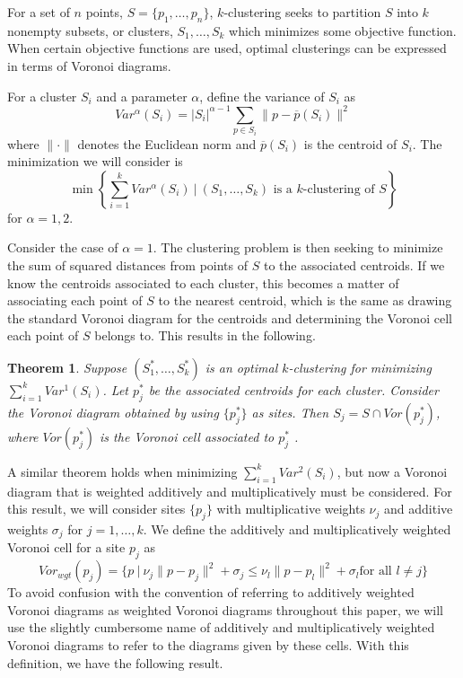 \documentclass[a4paper, 11pt]{article}
\newtheorem{theorem}{Theorem}[section]
\begin{document}
For a set of $n$ points, $S = \{p_1, \dots, p_n \}$, $k$-clustering seeks to partition $S$ into $k$ nonempty subsets, or clusters, $S_1, \dots, S_k$ which minimizes some objective
function. When certain objective functions are used, optimal clusterings can be expressed in terms of Voronoi diagrams.

For a cluster $S_i$ and a
parameter $\alpha$, define
the variance of $S_i$ as
\begin{equation}
  Var^\alpha(S_i) = |S_i|^{\alpha-1} \sum_{p \in S_i} \| p - \overline{p}(S_i) \|^2
  \label{def:var}
\end{equation}
where $\| \cdot \|$ denotes the Euclidean norm and $\overline{p}(S_i)$ is the centroid of $S_i$. The minimization we will consider is
\begin{equation}
  \min \left\{ \sum_{i=1}^k Var^\alpha (S_i) \ | \ (S_1,\dots, S_k) \text{ is a $k$-clustering of } S \right\}
  \label{eq:cluster}
\end{equation}
for $\alpha = 1,2$.

Consider the case of $\alpha = 1$. The clustering problem is then seeking to minimize the sum of squared distances from points of $S$ to the
associated centroids. If we know the centroids associated to each cluster, this becomes a matter of associating each point of $S$ to the nearest
centroid, which is the same as drawing the standard Voronoi diagram for the centroids and determining the Voronoi cell each point of $S$ belongs to.
This results in the following.

\begin{theorem}
  \label{thm:var_1}
  Suppose $(S_1^\ast, \dots, S_k^\ast)$ is an optimal $k$-clustering for minimizing $\sum_{i=1}^k Var^1(S_i)$. Let $p_j^\ast$ be the associated
  centroids for each cluster. Consider the Voronoi diagram obtained by using $\{ p_j^\ast \}$ as sites. Then $S_j = S \cap Vor(p_j^\ast)$, where
  $Vor(p_j^\ast)$ is the Voronoi cell associated to $p_j^\ast$ \cite{inaba_clustering} .
\end{theorem}

A similar theorem holds when minimizing $\sum_{i=1}^k Var^2(S_i)$, but now a Voronoi diagram that is weighted additively and multiplicatively must be
considered. For this result, we will consider sites $\{ p_j \}$ with multiplicative weights $\nu_j$ and additive
weights $\sigma_j$ for $j=1,\dots, k$. We define the additively and multiplicatively weighted Voronoi cell for a site $p_j$ as
\begin{equation}
  Vor_{wgt}( p_j ) = \{ p \ | \ \nu_j \| p - p_j \|^2 + \sigma_j \leq \nu_l \| p - p_l \|^2 + \sigma_l \text{
    for all $l \neq j$} \}
  \label{def:wgt_vor}
\end{equation}
To avoid confusion with the convention of referring to additively weighted Voronoi diagrams as weighted Voronoi diagrams throughout this paper, we
will use the slightly cumbersome name of additively and multiplicatively weighted Voronoi diagrams to refer to the diagrams given by these cells. With
this definition, we have the following result.
\end{document}
